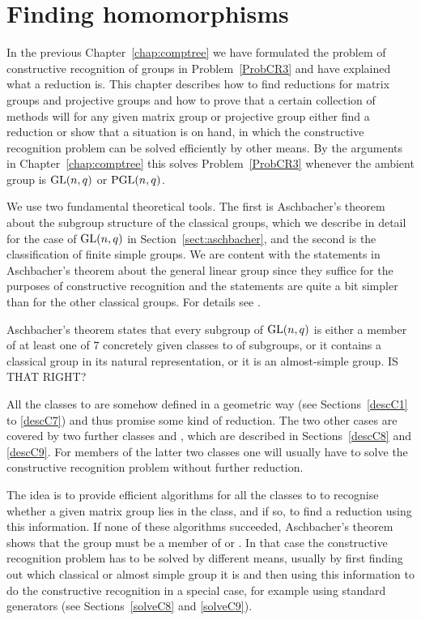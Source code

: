 
\chapter{Finding homomorphisms}
\label{chap:findhom}

In the previous Chapter~\ref{chap:comptree} we have formulated the problem
of constructive recognition of groups in Problem~\ref{ProbCR3} and have
explained what a reduction is. This chapter describes how to find
reductions for matrix groups and projective groups and how to prove
that a certain collection of methods will for any given
matrix group or projective group either find a reduction
or show that a situation is on hand, in which the constructive 
recognition problem can be solved efficiently by other means. By the 
arguments in Chapter~\ref{chap:comptree} this solves
Problem~\ref{ProbCR3} whenever the ambient group is $\GL(n,q)$ or
$\PGL(n,q)$.

We use two fundamental theoretical tools. The first is Aschbacher's theorem
about the subgroup structure of the classical groups, which we describe
in detail for the case of $\GL(n,q)$ in Section~\ref{sect:aschbacher},
and the second is the classification of finite simple groups. We are
content with the statements in Aschbacher's theorem about the general
linear group since they suffice for the purposes of constructive
recognition and the statements are quite a bit simpler than for the
other classical groups. For details see \cite{aschbacher}.

Aschbacher's theorem states that every subgroup of $\GL(n,q)$
is either a member of at least one of $7$ concretely given classes 
 to  of 
subgroups, or it contains a classical group in its natural representation, 
or it is an almost-simple group. IS THAT RIGHT?

All the classes  to  are somehow defined in a geometric way (see
Sections~\ref{descC1} to \ref{descC7}) and thus promise some kind of
reduction. The two other cases are covered by two further classes 
and , which are described in Sections~\ref{descC8} and \ref{descC9}.
For members of the latter two classes one will usually have to solve the
constructive recognition problem without further reduction.

The idea is to provide efficient algorithms for all the classes  to
 to recognise whether a given matrix group lies in the class, and if
so, to find a reduction using this information. If none of these algorithms
succeeded, Aschbacher's theorem shows that the group must be a member of
 or . In that case the constructive recognition problem has to be
solved by different means, usually by first finding out which classical
or almost simple group it is and then using this information to do the
constructive recognition in a special case, for example using standard
generators (see Sections~\ref{solveC8} and \ref{solveC9}).


